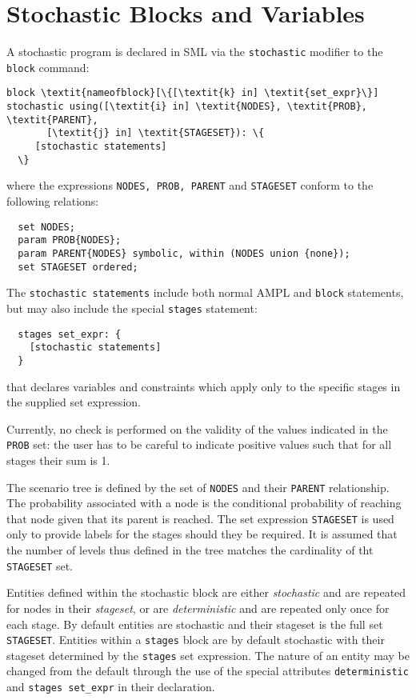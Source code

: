 \documentclass[10pt,a4paper]{report}
\begin{document}
\section{Stochastic Blocks and Variables}
A stochastic program is declared in SML via the {\tt stochastic} modifier
to the {\tt block} command:
\begin{Verbatim}[commandchars=\\\{\}]
  block \textit{nameofblock}[\{[\textit{k} in] \textit{set_expr}\}] stochastic using([\textit{i} in] \textit{NODES}, \textit{PROB}, \textit{PARENT}, 
       [\textit{j} in] \textit{STAGESET}): \{
     [stochastic statements]
  \}
\end{Verbatim}
where the expressions {\tt NODES, PROB, PARENT} and {\tt STAGESET} conform to
the following relations:
\begin{verbatim}
  set NODES; 
  param PROB{NODES};
  param PARENT{NODES} symbolic, within (NODES union {none});
  set STAGESET ordered;  
\end{verbatim}
The {\tt stochastic statements} include both normal AMPL and {\tt block}
statements, but may also include the special {\tt stages} statement:
\begin{verbatim}
  stages set_expr: {
    [stochastic statements]
  }
\end{verbatim}
that declares variables and constraints which apply only to the specific stages
in the supplied set expression.

Currently, no check is performed on the validity of the values indicated in
the {\tt PROB} set: the user has to be careful to indicate positive values
such that for all stages their sum is 1.

The scenario tree is defined by the set of {\tt NODES} and their {\tt PARENT}
relationship. The probability associated with a node is the conditional
probability of reaching that node given that its parent is reached. The
set expression {\tt STAGESET} is used only to provide labels for the stages
should they be required.
It is assumed that the number of levels thus defined in the tree matches the
cardinality of tht {\tt STAGESET} set.

Entities defined within the stochastic block are either {\it stochastic} and
are repeated for nodes in their {\it stageset}, or are {\it deterministic} and
are repeated only once for each stage. By default entities are stochastic and
their stageset is the full set {\tt STAGESET}. Entities within a {\tt stages}
block are by default stochastic with their stageset determined by the
{\tt stages} set expression.
The nature of an entity may be changed from the default through the use of the
special attributes {\tt deterministic} and {\tt stages set\_expr} in their
declaration.
\end{document}
